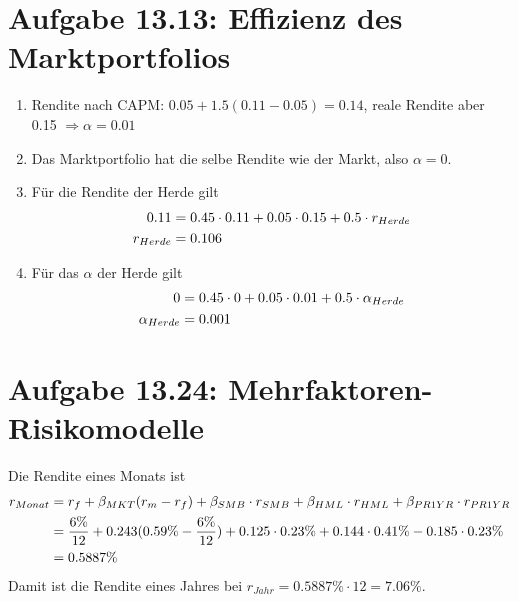 \documentclass{article}
\begin{document}
	\section*{Aufgabe 13.13: Effizienz des Marktportfolios}
	\begin{enumerate}[label=(\alph*)]
		\item Rendite nach CAPM: $0.05+1.5(0.11-0.05)=0.14$, reale Rendite aber 0.15 $\Rightarrow \alpha = 0.01$
		\item Das Marktportfolio hat die selbe Rendite wie der Markt, also $\alpha=0$.
		\item Für die Rendite der Herde gilt
		\begin{align}
			0.11 &= 0.45\cdot 0.11 + 0.05\cdot 0.15 + 0.5\cdot r_{Herde} \notag \\
			r_{Herde} &= 0.106 \notag
		\end{align}
		\item Für das $\alpha$ der Herde gilt
		\begin{align}
			0 &= 0.45\cdot 0 + 0.05\cdot 0.01 + 0.5\cdot \alpha_{Herde} \notag \\
			\alpha_{Herde} &= 0.001 \notag
		\end{align}
	\end{enumerate}
	
	\section*{Aufgabe 13.24: Mehrfaktoren-Risikomodelle}
	Die Rendite eines Monats ist
	\begin{align}
		r_{Monat} &= r_f + \beta_{MKT}(r_m-r_f) + \beta_{SMB}\cdot r_{SMB} + \beta_{HML}\cdot r_{HML} + \beta_{PR1YR}\cdot r_{PR1YR} \notag \\
		&= \frac{6\%}{12} + 0.243(0.59\% - \frac{6\%}{12}) + 0.125\cdot 0.23\% + 0.144\cdot 0.41\% - 0.185\cdot 0.23\% \notag \\
		&= 0.5887\% \notag
	\end{align}
	Damit ist die Rendite eines Jahres bei $r_{Jahr}=0.5887\%\cdot 12 = 7.06\%$.
\end{document}
